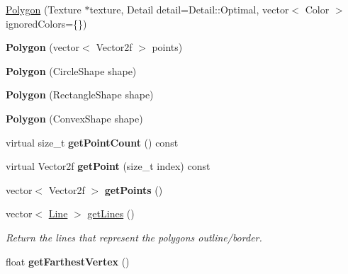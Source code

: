 \begin{DoxyCompactItemize}
\item 
\mbox{\hyperlink{class_polygon_a55f28f7bcae8df65ea11b99ff192b7d7}{Polygon}} (Texture $\ast$texture, Detail detail=Detail\+::\+Optimal, vector$<$ Color $>$ ignored\+Colors=\{\})
\item 
\mbox{\label{class_polygon_ac44cbd15f8a7a389d9f553e1bdeceea0}} 
{\bfseries Polygon} (vector$<$ Vector2f $>$ points)
\item 
\mbox{\label{class_polygon_abb2febc822883a9bbc7fdfac64475539}} 
{\bfseries Polygon} (Circle\+Shape shape)
\item 
\mbox{\label{class_polygon_ac83748b0a87551cc4e190254303f9911}} 
{\bfseries Polygon} (Rectangle\+Shape shape)
\item 
\mbox{\label{class_polygon_a37104a58675193c3598c19b41f4eadda}} 
{\bfseries Polygon} (Convex\+Shape shape)
\item 
\mbox{\label{class_polygon_af16db77f60fa0f12b72cf0517aca0669}} 
virtual size\+\_\+t {\bfseries get\+Point\+Count} () const
\item 
\mbox{\label{class_polygon_a336e2540d24e30a4be6be163e2137323}} 
virtual Vector2f {\bfseries get\+Point} (size\+\_\+t index) const
\item 
\mbox{\label{class_polygon_a5013385231c9027d00cb57dffc030ae4}} 
vector$<$ Vector2f $>$ {\bfseries get\+Points} ()
\item 
vector$<$ \mbox{\hyperlink{class_line}{Line}} $>$ \mbox{\hyperlink{class_polygon_acbeaa5a9990ee704fdfa766d4a34b86c}{get\+Lines}} ()
\begin{DoxyCompactList}\small\item\em Return the lines that represent the polygon\textquotesingle{}s outline/border. \end{DoxyCompactList}\item 
\mbox{\label{class_polygon_aa4da77df0658cdcc0797443844c69a3f}} 
float {\bfseries get\+Farthest\+Vertex} ()
\item 
\mbox{\label{class_polygon_a70345633fc22991a66923b2b9db197fc}} 

\end{DoxyCompactItemize}
